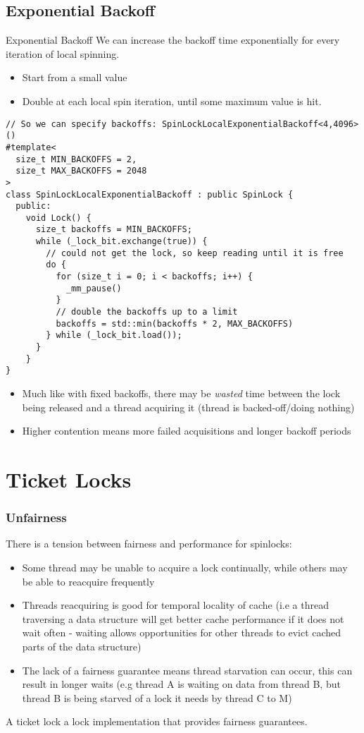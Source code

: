 \subsection{Exponential Backoff}
\begin{definitionbox}{Exponential Backoff}
  We can increase the backoff time exponentially for every iteration of local spinning.
  \begin{itemize}
    \item Start from a small value
    \item Double at each local spin iteration, until some maximum value is hit.
  \end{itemize}
\end{definitionbox}
\begin{verbatim}
// So we can specify backoffs: SpinLockLocalExponentialBackoff<4,4096>()
#template<
  size_t MIN_BACKOFFS = 2,
  size_t MAX_BACKOFFS = 2048
>
class SpinLockLocalExponentialBackoff : public SpinLock {
  public:
    void Lock() {
      size_t backoffs = MIN_BACKOFFS;
      while (_lock_bit.exchange(true)) { 
        // could not get the lock, so keep reading until it is free
        do {
          for (size_t i = 0; i < backoffs; i++) {
            _mm_pause()
          }
          // double the backoffs up to a limit
          backoffs = std::min(backoffs * 2, MAX_BACKOFFS)
        } while (_lock_bit.load());
      }
    }
}
\end{verbatim}
\begin{itemize}
  \item Much like with fixed backoffs, there may be \textit{wasted} time between the lock being released and a thread acquiring it (thread is backed-off/doing nothing)
  \item Higher contention means more failed acquisitions and longer backoff periods
\end{itemize}

\section{Ticket Locks}
\subsubsection{Unfairness}
There is a tension between fairness and performance for spinlocks:
\begin{itemize}
  \item Some thread may be unable to acquire a lock continually, while others may be able to reacquire frequently
  \item Threads reacquiring is good for temporal locality of cache (i.e a thread traversing a data structure will get better cache performance if it does not wait often - waiting allows opportunities for other threads to evict cached parts of the data structure)
  \item The lack of a fairness guarantee means thread starvation can occur, this can result in longer waits (e.g thread A is waiting on data from thread B, but thread B is being starved of a lock it needs by thread C to M)
\end{itemize}
A ticket lock a lock implementation that provides fairness guarantees.


